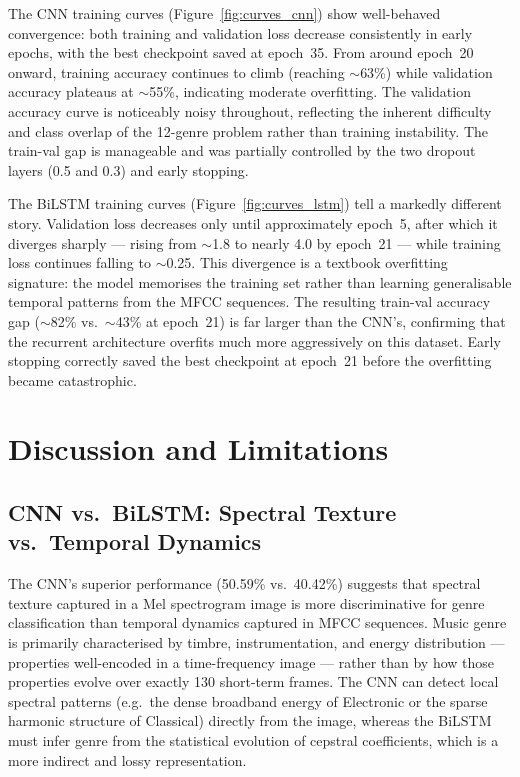 \documentclass[12pt, a4paper]{article}
\begin{document}
The CNN training curves (Figure~\ref{fig:curves_cnn}) show well-behaved convergence: both
training and validation loss decrease consistently in early epochs, with the best
checkpoint saved at epoch~35. From around epoch~20 onward, training accuracy continues
to climb (reaching $\sim$63\%) while validation accuracy plateaus at $\sim$55\%,
indicating moderate overfitting. The validation accuracy curve is noticeably noisy
throughout, reflecting the inherent difficulty and class overlap of the 12-genre
problem rather than training instability. The train-val gap is manageable and was
partially controlled by the two dropout layers (0.5 and 0.3) and early stopping.

The BiLSTM training curves (Figure~\ref{fig:curves_lstm}) tell a markedly different
story. Validation loss decreases only until approximately epoch~5, after which it
diverges sharply --- rising from $\sim$1.8 to nearly 4.0 by epoch~21 --- while training
loss continues falling to $\sim$0.25. This divergence is a textbook overfitting
signature: the model memorises the training set rather than learning generalisable
temporal patterns from the MFCC sequences. The resulting train-val accuracy gap
($\sim$82\% vs.\ $\sim$43\% at epoch~21) is far larger than the CNN's, confirming that
the recurrent architecture overfits much more aggressively on this dataset. Early
stopping correctly saved the best checkpoint at epoch~21 before the overfitting became
catastrophic.

\section{Discussion and Limitations}
\label{sec:discussion}

\subsection{CNN vs.\ BiLSTM: Spectral Texture vs.\ Temporal Dynamics}

The CNN's superior performance (50.59\% vs.\ 40.42\%) suggests that spectral texture
captured in a Mel spectrogram image is more discriminative for genre classification than
temporal dynamics captured in MFCC sequences. Music genre is primarily characterised by
timbre, instrumentation, and energy distribution --- properties well-encoded in a
time-frequency image --- rather than by how those properties evolve over exactly 130
short-term frames. The CNN can detect local spectral patterns (e.g.\ the dense
broadband energy of Electronic or the sparse harmonic structure of Classical) directly
from the image, whereas the BiLSTM must infer genre from the statistical evolution of
cepstral coefficients, which is a more indirect and lossy representation.
\end{document}
